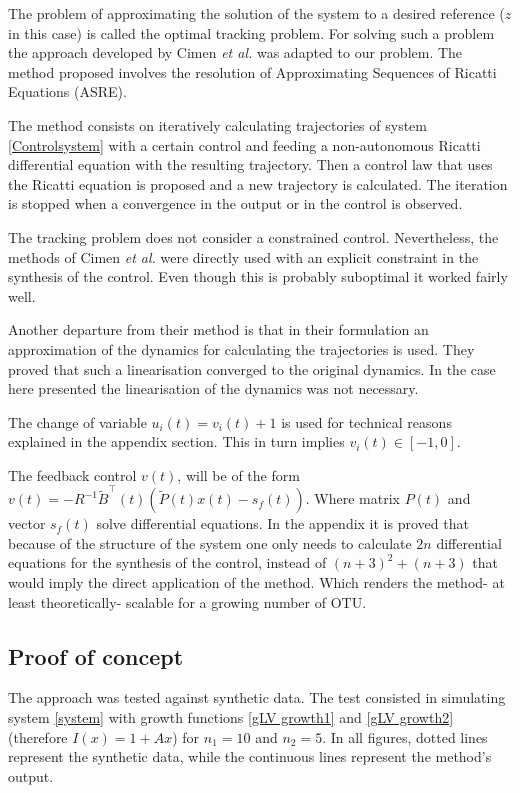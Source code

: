 \documentclass[3p,times]{elsarticle}
\begin{document}
The problem of approximating the solution of the system to a desired reference ($z$ in this case) is called the optimal tracking problem. For solving such a problem the approach developed by Cimen \textit{et al.} \cite{Cimen2004, Cimen2008} was adapted to our problem. The method proposed involves the resolution of Approximating Sequences of Ricatti Equations (ASRE). 

The method consists on iteratively calculating trajectories of system \eqref{Controlsystem} with a certain control and feeding a non-autonomous Ricatti differential equation with the resulting trajectory. Then a control law that uses the Ricatti equation is proposed and a new trajectory is calculated. The iteration is stopped when a convergence in the output or in the control is observed.

The tracking problem does not consider a constrained control. Nevertheless, the methods of Cimen \textit{et al.}\cite{Cimen2004} were directly used with an explicit constraint in the synthesis of the control. Even though this is probably suboptimal it worked fairly well.

Another departure from their method is that in their formulation an approximation of the dynamics for calculating the trajectories is used. They proved that such a linearisation converged to the original dynamics. In the case here presented the linearisation of the dynamics was not necessary.

The change of variable $u_i(t) = v_i(t) + 1$ is used for technical reasons explained in the appendix section. This in turn implies $v_i(t) \in [-1,0]$.

The feedback control $v(t)$, will be of the form $v(t) = -R^{-1}\tilde{B}^\top(t)\left(\tilde{P}(t)x(t)-s_f(t)\right)$. Where matrix $P(t)$ and vector $s_f(t)$ solve differential equations. In the appendix it is proved that because of the structure of the system one only needs to calculate $2n$ differential equations for the synthesis of the control, instead of $(n+3)^2 + (n+3)$ that would imply the direct application of the method. Which renders the method- at least theoretically- scalable for a growing number of OTU.

\subsection{Proof of concept}

The approach was tested against synthetic data. The test consisted in simulating system \eqref{system} with growth functions \eqref{gLV growth1} and \eqref{gLV growth2} (therefore $I(x) = 1 + Ax$) for $n_1 = 10$ and $n_2 = 5$. In all figures, dotted lines represent the synthetic data, while the continuous lines represent the method's output.
\end{document}
